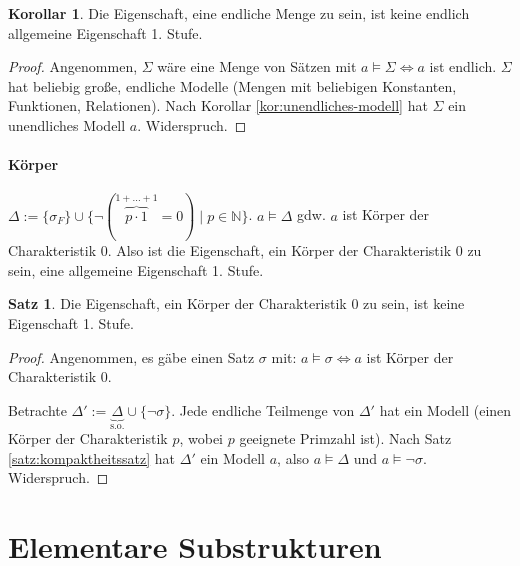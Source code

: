 \documentclass{article}
\theoremstyle{definition}
\newtheorem{satz}[dfn]{Satz}
\newtheorem{kor}[dfn]{Korollar}
\theoremstyle{plain}
\begin{document}
    \begin{kor}
        Die Eigenschaft, eine endliche Menge zu sein, ist keine endlich allgemeine Eigenschaft 1. Stufe.
    \end{kor}

    \begin{proof}
        Angenommen, $ \Sigma $ wäre eine Menge von Sätzen mit $ a \models \Sigma \Leftrightarrow a $ ist endlich.
        $ \Sigma $ hat beliebig große, endliche Modelle (Mengen mit beliebigen Konstanten, Funktionen, Relationen).
        Nach Korollar \ref{kor:unendliches-modell} hat $ \Sigma  $ ein unendliches Modell $ a $. Widerspruch.
    \end{proof}

    \paragraph{Körper}
    $ \Delta := \{ \sigma_F \} \cup \{ \neg(\overbrace{p \cdot 1}^{1 + ... + 1} = 0 ) \mid p \in \mathbb{N} \} $.
    $ a \models \Delta $ gdw. $ a $ ist Körper der Charakteristik $ 0 $.
    Also ist die Eigenschaft, ein Körper der Charakteristik 0 zu sein, eine allgemeine Eigenschaft 1. Stufe.

    \begin{satz}
        Die Eigenschaft, ein Körper der Charakteristik $ 0 $ zu sein, ist keine Eigenschaft 1. Stufe.
    \end{satz}

    \begin{proof}
        Angenommen, es gäbe einen Satz $ \sigma $ mit: $ a \models \sigma \Leftrightarrow a $ ist Körper der Charakteristik $ 0 $.

        Betrachte $ \Delta' := \underbrace{\Delta}_{\text{s.o.}} \cup \{ \neg \sigma \} $.
        Jede endliche Teilmenge von $ \Delta' $ hat ein Modell (einen Körper der Charakteristik $ p $, wobei $ p $ geeignete Primzahl ist).
        Nach Satz \ref{satz:kompaktheitssatz} hat $ \Delta' $ ein Modell $ a $, also $ a \models \Delta $ und $ a \models \neg \sigma $.
        Widerspruch.
    \end{proof}

    \section{Elementare Substrukturen}
\end{document}
